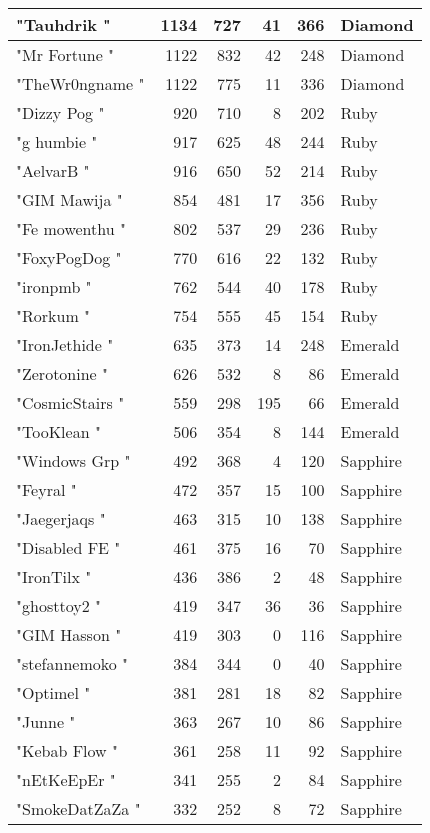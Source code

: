 \documentclass{article}
\begin{document}
\begin{table}[htbp]
\begin{tabular}{|l|r|r|r|r|l|}
"Tauhdrik " & 1134 & 727 & 41 & 366 & Diamond \\ \hline
"Mr Fortune " & 1122 & 832 & 42 & 248 & Diamond \\ \hline
"TheWr0ngname " & 1122 & 775 & 11 & 336 & Diamond \\ \hline
"Dizzy Pog " & 920 & 710 & 8 & 202 & Ruby \\ \hline
"g humbie " & 917 & 625 & 48 & 244 & Ruby \\ \hline
"AelvarB " & 916 & 650 & 52 & 214 & Ruby \\ \hline
"GIM Mawija " & 854 & 481 & 17 & 356 & Ruby \\ \hline
"Fe mowenthu " & 802 & 537 & 29 & 236 & Ruby \\ \hline
"FoxyPogDog " & 770 & 616 & 22 & 132 & Ruby \\ \hline
"ironpmb " & 762 & 544 & 40 & 178 & Ruby \\ \hline
"Rorkum " & 754 & 555 & 45 & 154 & Ruby \\ \hline
"IronJethide " & 635 & 373 & 14 & 248 & Emerald \\ \hline
"Zerotonine " & 626 & 532 & 8 & 86 & Emerald \\ \hline
"CosmicStairs " & 559 & 298 & 195 & 66 & Emerald \\ \hline
"TooKlean " & 506 & 354 & 8 & 144 & Emerald \\ \hline
"Windows Grp " & 492 & 368 & 4 & 120 & Sapphire \\ \hline
"Feyral " & 472 & 357 & 15 & 100 & Sapphire \\ \hline
"Jaegerjaqs " & 463 & 315 & 10 & 138 & Sapphire \\ \hline
"Disabled FE " & 461 & 375 & 16 & 70 & Sapphire \\ \hline
"IronTilx " & 436 & 386 & 2 & 48 & Sapphire \\ \hline
"ghosttoy2 " & 419 & 347 & 36 & 36 & Sapphire \\ \hline
"GIM Hasson " & 419 & 303 & 0 & 116 & Sapphire \\ \hline
"stefannemoko " & 384 & 344 & 0 & 40 & Sapphire \\ \hline
"Optimel " & 381 & 281 & 18 & 82 & Sapphire \\ \hline
"Junne " & 363 & 267 & 10 & 86 & Sapphire \\ \hline
"Kebab Flow " & 361 & 258 & 11 & 92 & Sapphire \\ \hline
"nEtKeEpEr " & 341 & 255 & 2 & 84 & Sapphire \\ \hline
"SmokeDatZaZa " & 332 & 252 & 8 & 72 & Sapphire \\ \hline

\end{tabular}
\end{table}
\end{document}
